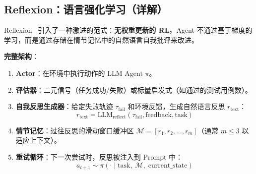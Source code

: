 \subsection{Reflexion：语言强化学习（详解）}
\label{reflexion-verbal-reinforcement-learning-detailed}

Reflexion~\cite{shinn2023reflexion} 引入了一种激进的范式：\textbf{无权重更新的 RL}。Agent 不通过基于梯度的学习，而是通过存储在情节记忆中的自然语言自我批评来改进。

\textbf{完整架构}：

\begin{enumerate}
  \item \textbf{Actor}：在环境中执行动作的 LLM Agent $\pi$。
  \item \textbf{评估器}：二元信号（任务成功/失败）或标量启发式（如通过的测试用例数）。
  \item \textbf{自我反思生成器}：给定失败轨迹 $\tau_{\text{fail}}$ 和环境反馈，生成自然语言反思 $r_{\text{text}}$：
\begin{equation}
r_{\text{text}} = \text{LLM}_{\text{reflect}}\!\left(\tau_{\text{fail}}, \text{feedback}, \text{task}\right)
\end{equation}
  \item \textbf{情节记忆}：过往反思的滑动窗口缓冲区 $\mathcal{M} = [r_1, r_2, \ldots, r_m]$（通常 $m \leq 3$ 以适应上下文）。
  \item \textbf{重试循环}：下一次尝试时，反思被注入到 Prompt 中：
\begin{equation}
a_{t+1} \sim \pi\!\left(\cdot\; |\; \text{task},\; \mathcal{M},\; \text{current\_state}\right)
\end{equation}
\end{enumerate}

